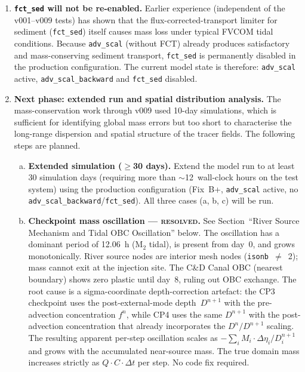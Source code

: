 \documentclass[11pt]{article}
\begin{document}
\begin{enumerate}
\item \textbf{\texttt{fct\_sed} will not be re-enabled.}
Earlier experience (independent of the v001--v009 tests) has shown that the
flux-corrected-transport limiter for sediment (\texttt{fct\_sed}) itself
causes mass loss under typical FVCOM tidal conditions.  Because
\texttt{adv\_scal} (without FCT) already produces satisfactory and
mass-conserving sediment transport, \texttt{fct\_sed} is permanently
disabled in the production configuration.  The current model state is
therefore: \texttt{adv\_scal} active, \texttt{adv\_scal\_backward} and
\texttt{fct\_sed} disabled.

\item \textbf{Next phase: extended run and spatial distribution analysis.}
The mass-conservation work through v009 used 10-day simulations, which is
sufficient for identifying global mass errors but too short to characterise
the long-range dispersion and spatial structure of the tracer fields.  The
following steps are planned.

\begin{enumerate}[(a)]

  \item \textbf{Extended simulation ($\geq$30 days).}
        Extend the model run to at least 30 simulation days (requiring more
        than $\sim$12~wall-clock hours on the test system) using the
        production configuration (Fix~B+, \texttt{adv\_scal} active, no
        \texttt{adv\_scal\_backward}/\texttt{fct\_sed}).  All three cases
        (a, b, c) will be run.

  \item \textbf{Checkpoint mass oscillation --- \textsc{resolved}.}
        See Section~``River Source Mechanism and Tidal OBC Oscillation'' below.
        The oscillation has a dominant period of 12.06~h (M$_2$ tidal), is
        present from day~0, and grows monotonically.  River source nodes are
        interior mesh nodes (\texttt{isonb}~$\neq$~2); mass cannot exit at
        the injection site.  The C\&D Canal OBC (nearest boundary) shows zero
        plastic until day~8, ruling out OBC exchange.  The root cause is a
        sigma-coordinate depth-correction artefact: the CP3 checkpoint uses the
        post-external-mode depth~$D^{n+1}$ with the pre-advection concentration
        $f^n$, while CP4 uses the same $D^{n+1}$ with the post-advection
        concentration that already incorporates the $D^n/D^{n+1}$ scaling.
        The resulting apparent per-step oscillation scales as
        $-\sum_i M_i\cdot\Delta\eta_i/D_i^{n+1}$ and grows with the
        accumulated near-source mass.  The true domain mass increases
        strictly as $Q\cdot C\cdot\Delta t$ per step.  No code fix required.


\end{enumerate}
\end{enumerate}
\end{document}
